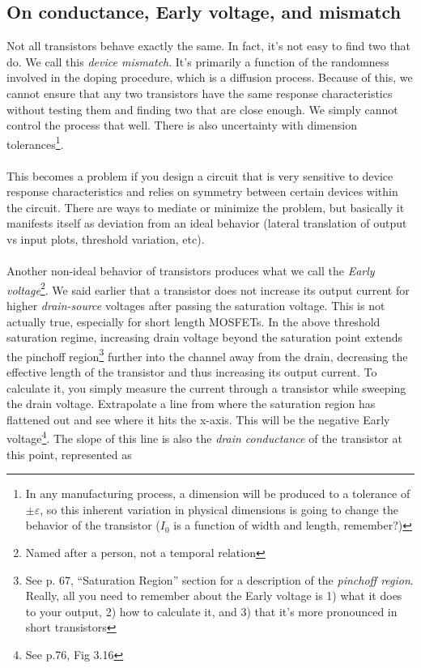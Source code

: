 \subsection{On conductance, Early voltage, and mismatch}
Not all transistors behave exactly the same. In fact, it's not easy to find two that do. We call this \emph{device mismatch}. It's primarily a function of the randomness involved in the doping procedure, which is a diffusion process. Because of this, we cannot ensure that any two transistors have the same response characteristics without testing them and finding two that are close enough. We simply cannot control the process that well. There is also uncertainty with dimension tolerances\footnote{In any manufacturing process, a dimension will be produced to a tolerance of $\pm\varepsilon$, so this inherent variation in physical dimensions is going to change the behavior of the transistor ($I_0$ is a function of width and length, remember?)}.\\ \\
This becomes a problem if you design a circuit that is very sensitive to device response characteristics and relies on symmetry between certain devices within the circuit. There are ways to mediate or minimize the problem, but  basically it manifests itself as deviation from an ideal behavior (lateral translation of output vs input plots, threshold variation, etc).\\ \\
Another non-ideal behavior of transistors produces what we call the \emph{Early voltage}\footnote{Named after a person, not a temporal relation}. We said earlier that a transistor does not increase its output current for higher \emph{drain-source} voltages after passing the saturation voltage. This is not actually true, especially for short length MOSFETs. In the above threshold saturation regime, increasing drain voltage beyond the saturation point extends the pinchoff region\footnote{See p. 67, ``Saturation Region'' section for a description of the \emph{pinchoff region}. Really, all you need to remember about the Early voltage is 1) what it does to your output, 2) how to calculate it, and 3) that it's more pronounced in short transistors} further into the channel away from the drain, decreasing the effective length of the transistor and thus increasing its output current. To calculate it, you simply measure the current through a transistor while sweeping the drain voltage. Extrapolate a line from where the saturation region has flattened out and see where it hits the x-axis. This will be the negative Early voltage\footnote{See p.76, Fig 3.16}. The slope of this line is also the \emph{drain conductance} of the transistor at this point, represented as
